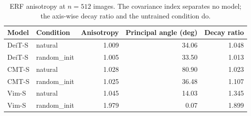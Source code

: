 \begin{table}[tbp]
\centering
\caption{ERF anisotropy at $n=512$ images. The covariance index separates no model; the axis-wise decay ratio and the untrained condition do.}
\label{tab:e2}
\begin{tabular}{llrrr}
\toprule
Model & Condition & Anisotropy & Principal angle (deg) & Decay ratio \\
\midrule
DeiT-S & natural & 1.009 & 34.06 & 1.048 \\
DeiT-S & random\_init & 1.005 & 33.50 & 1.013 \\
CMT-S & natural & 1.028 & 80.90 & 1.023 \\
CMT-S & random\_init & 1.025 & 36.48 & 1.107 \\
Vim-S & natural & 1.045 & 14.03 & 1.345 \\
Vim-S & random\_init & 1.979 & 0.07 & 1.899 \\
\bottomrule
\end{tabular}
\end{table}
